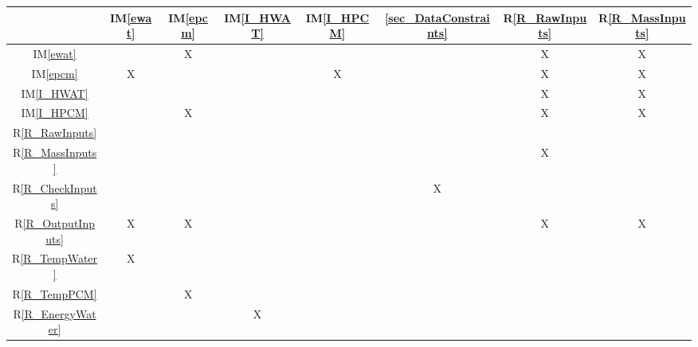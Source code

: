 \documentclass[12pt]{article}
\newcommand{\iref}[1]{IM\ref{#1}}
\newcommand{\rref}[1]{R\ref{#1}}
\begin{document}
\begin{table}[h!]
    \centering
    \begin{tabular}{|c|c|c|c|c|c|c|c|}
        \hline
                               & \iref{ewat} & \iref{epcm} & \iref{I_HWAT} & \iref{I_HPCM} & \ref{sec_DataConstraints} & \rref{R_RawInputs} & \rref{R_MassInputs} \\
        \hline
        \iref{ewat}            &             & X           &               &               &                           & X                  & X                   \\ \hline
        \iref{epcm}            & X           &             &               & X             &                           & X                  & X                   \\ \hline
        \iref{I_HWAT}          &             &             &               &               &                           & X                  & X                   \\ \hline
        \iref{I_HPCM}          &             & X           &               &               &                           & X                  & X                   \\ \hline
        \rref{R_RawInputs}     &             &             &               &               &                           &                    &                     \\ \hline
        \rref{R_MassInputs}    &             &             &               &               &                           & X                  &                     \\ \hline
        \rref{R_CheckInputs}   &             &             &               &               & X                         &                    &                     \\ \hline
        \rref{R_OutputInputs}  & X           & X           &               &               &                           & X                  & X                   \\ \hline
        \rref{R_TempWater}     & X           &             &               &               &                           &                    &                     \\ \hline
        \rref{R_TempPCM}       &             & X           &               &               &                           &                    &                     \\ \hline
        \rref{R_EnergyWater}   &             &             & X             &               &                           &                    &                     \\ \hline

\end{tabular}
\end{table}
\end{document}
